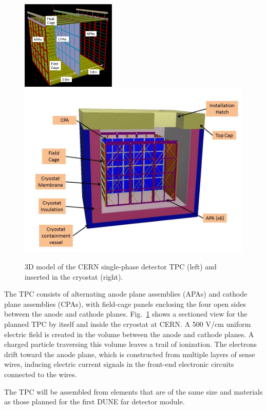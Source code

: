 \begin{figure}[htb]
\centering
\begin{minipage}[b]{1.0\textwidth}
\begin{center}
\includegraphics[width=0.40\textwidth]{figures/CERN_single_TPC}
\includegraphics[width=.59\textwidth]{figures/TPC-3D-section.jpg}
\end{center}
\end{minipage}
\caption{\small 3D model of the CERN single-phase detector TPC (left) and inserted in the cryostat (right).}
\label{fig:CERNdet-overview}
\end{figure}

The TPC consists of alternating anode plane assemblies (APAs) and cathode plane assemblies (CPAs), with field-cage panels enclosing the four open sides between the anode and cathode planes.  Fig.~\ref{fig:CERNdet-overview} shows a sectioned view for the planned TPC 
by itself and inside the cryostat at CERN.  A 500 V/cm uniform electric field is created in the volume between the anode and cathode planes. A charged particle traversing this volume leaves a trail of ionization. The electrons drift toward the anode plane, which is constructed from multiple layers of sense wires, inducing electric current signals in the front-end electronic circuits connected to the wires.

The TPC will be assembled from elements that are of the same size and materials as those planned for the first DUNE far detector module.  

